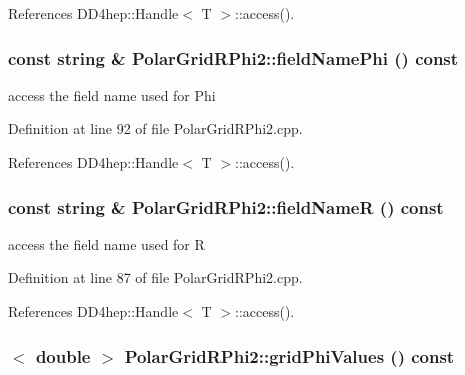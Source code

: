 References DD4hep::Handle$<$ T $>$::access().\hypertarget{class_d_d4hep_1_1_geometry_1_1_polar_grid_r_phi2_a956f68ffe127069c7dd7e51417cdece1}{
\subsubsection[{fieldNamePhi}]{\setlength{\rightskip}{0pt plus 5cm}const {\bf string} \& PolarGridRPhi2::fieldNamePhi () const}}
\label{class_d_d4hep_1_1_geometry_1_1_polar_grid_r_phi2_a956f68ffe127069c7dd7e51417cdece1}


access the field name used for Phi 

Definition at line 92 of file PolarGridRPhi2.cpp.

References DD4hep::Handle$<$ T $>$::access().\hypertarget{class_d_d4hep_1_1_geometry_1_1_polar_grid_r_phi2_a03ca58597b6ca26e247c5ba7f59b59b6}{
\subsubsection[{fieldNameR}]{\setlength{\rightskip}{0pt plus 5cm}const {\bf string} \& PolarGridRPhi2::fieldNameR () const}}
\label{class_d_d4hep_1_1_geometry_1_1_polar_grid_r_phi2_a03ca58597b6ca26e247c5ba7f59b59b6}


access the field name used for R 

Definition at line 87 of file PolarGridRPhi2.cpp.

References DD4hep::Handle$<$ T $>$::access().\hypertarget{class_d_d4hep_1_1_geometry_1_1_polar_grid_r_phi2_ab4ef99171afc6b7e6b603c11b3b3cc19}{
\subsubsection[{gridPhiValues}]{$<$ double $>$ PolarGridRPhi2::gridPhiValues () const}}
\label{class_d_d4hep_1_1_geometry_1_1_polar_grid_r_phi2_ab4ef99171afc6b7e6b603c11b3b3cc19}


